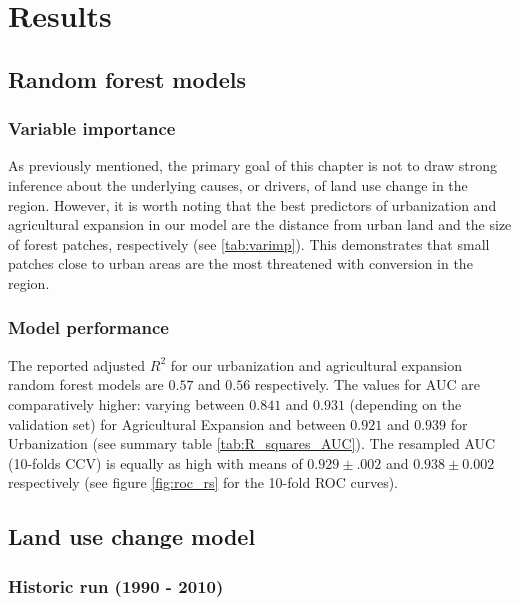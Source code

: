 \section{Results}

\subsection{Random forest models}

\subsubsection{Variable importance}

As previously mentioned, the primary goal of this chapter is not to draw strong inference about the underlying causes, or drivers, of land use change in the region. However, it is worth noting that the best predictors of urbanization and agricultural expansion in our model are the distance from urban land and the size of forest patches, respectively (see \ref{tab:varimp}). This demonstrates that small patches close to urban areas are the most threatened with conversion in the region. \\

\subsubsection{Model performance}

The reported adjusted  $R^{2}$ for our urbanization and agricultural expansion random forest models are $0.57$ and $0.56$ respectively. The values for AUC are comparatively higher: varying between $0.841$ and $0.931$ (depending on the validation set) for Agricultural Expansion and between $0.921$ and $0.939$ for Urbanization (see summary table \ref{tab:R_squares_AUC}). The resampled AUC (10-folds CCV) is equally as high with means of $0.929 \pm .002$ and $0.938 \pm 0.002$ respectively (see figure \ref{fig:roc_rs} for the 10-fold ROC curves).\\

\subsection{Land use change model}

\subsubsection*{Historic run (1990 - 2010)}

